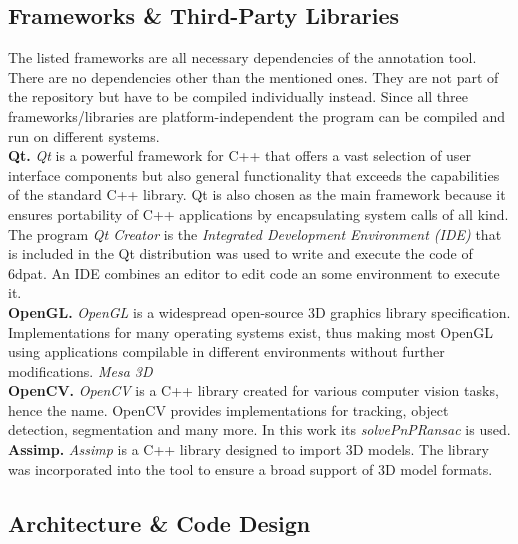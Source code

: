 \subsection{Frameworks \& Third-Party Libraries}

The listed frameworks are all necessary dependencies of the annotation tool. There are no dependencies other than the mentioned ones. They are not part of the repository but have to be compiled individually instead. Since all three frameworks/libraries are platform-independent the program can be compiled and run on different systems. \\

\noindent\textbf{Qt.} \textit{Qt} \cite{qt} is a powerful framework for C++ that offers a vast selection of user interface components but also general functionality that exceeds the capabilities of the standard C++ library. Qt is also chosen as the main framework because it ensures portability of C++ applications by encapsulating system calls of all kind. The program \textit{Qt Creator} is the \textit{Integrated Development Environment (IDE)} that is included in the Qt distribution was used to write and execute the code of \gls{6dpat}. An IDE combines an editor to edit code an some environment to execute it. \\

\noindent\textbf{OpenGL.} \textit{OpenGL} \cite{opengl} is a widespread open-source 3D graphics library specification. Implementations for many operating systems exist, thus making most OpenGL using applications compilable in different environments without further modifications. \textit{Mesa 3D} \\

\noindent\textbf{OpenCV.} \textit{OpenCV} \cite{opencv} is a C++ library created for various computer vision tasks, hence the name. OpenCV provides implementations for tracking, object detection, segmentation and many more. In this work its \textit{solvePnPRansac} is used. \\

\noindent\textbf{Assimp.} \textit{Assimp} \cite{assimp} is a C++ library designed to import 3D models. The library was incorporated into the tool to ensure a broad support of 3D model formats.

\subsection{Architecture \& Code Design}


